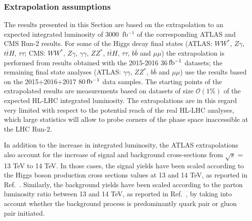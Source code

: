 \subsubsection{Extrapolation assumptions}
\label{sec:HiggsExtrapAss}

The results presented in this Section are based on the extrapolation to an expected integrated luminosity of 3000~fb$^{-1}$ %
of the corresponding ATLAS and CMS Run-2 results. For some of the Higgs decay final states (ATLAS: $WW^*$, $Z\gamma$, $t\bar{t}H$, $\tau\tau$; CMS: $WW^*$, $Z\gamma$, $\gamma\gamma$, $ZZ^*$, $t\bar{t}H$, $\tau\tau$, $b\bar{b}$ and $\mu\mu$) the extrapolation is performed from results obtained with the 2015-2016 36\,$\mbox{fb$^{-1}$}$ datasets; the remaining final state analyses (ATLAS: $\gamma\gamma$, $ZZ^*$, $b\bar{b}$ and $\mu\mu$) use the results based on the 2015+2016+2017 80\,$\mbox{fb$^{-1}$}$ data samples. The starting points of the extrapolated results are measurements based on datasets of size $\mathcal{O}(1\%)$ of the expected HL-LHC integrated luminosity. The extrapolations are in this regard very limited with respect to the potential reach of the real HL-LHC analyses, which large statistics will allow to probe corners of the phase space inaccessible at the LHC Run-2.
    
In addition to the increase in integrated luminosity, the ATLAS extrapolations also account for the increase of signal and background cross-sections from $\sqrt{s}$ = 13 TeV to 14 TeV.  In those cases, the signal yields have been scaled according to the Higgs boson production cross sections values at 13 and 14 TeV, as reported in Ref.~\cite{deFlorian:2016spz}. Similarly, the background yields have been scaled according to the parton luminosity ratio between 13 and 14 TeV, as reported in Ref.~\cite{Heinemeyer:2013tqa}, by taking into account whether the background process is predominantly quark pair or gluon pair initiated.

